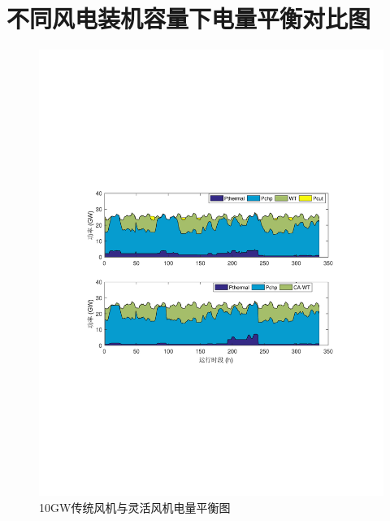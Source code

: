 \section{不同风电装机容量下电量平衡对比图}
\begin{figure}[H] %
  \centering
  \includegraphics[scale=0.85]{figures/Chap5-Power-Balance-10G-WT.pdf}
  \caption{10GW传统风机与灵活风机电量平衡图}
  \label{fig:Power-Balance-10G-WT}
\end{figure}



